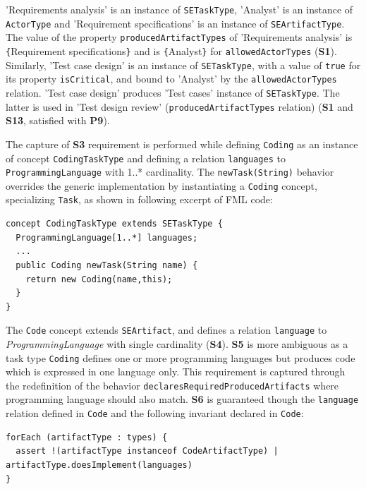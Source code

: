 
\textsf{'Requirements analysis'} is an instance of \texttt{SETaskType}, \textsf{'Analyst'} is an instance of \texttt{ActorType} and \textsf{'Requirement specifications'} is an instance of \texttt{SEArtifactType}. The value of the property \texttt{producedArtifactTypes} of \textsf{'Requirements analysis'} is \texttt{\{}\textsf{Requirement specifications}\texttt{\}} and is \texttt{\{}\textsf{Analyst}\texttt{\}} for \texttt{allowedActorTypes} (\textbf{S1}). Similarly, \textsf{'Test case design'} is an instance of \texttt{SETaskType}, with a value of \texttt{true} for its property \texttt{isCritical}, and bound to \textsf{'Analyst'} by the \texttt{allowedActorTypes} relation. \textsf{'Test case design'} produces \textsf{'Test cases'} instance of \texttt{SETaskType}. The latter is used in \textsf{'Test design review'} (\texttt{producedArtifactTypes} relation) (\textbf{S1} and \textbf{S13}, satisfied with \textbf{P9}). 

The capture of \textbf{S3} requirement is performed while defining \texttt{Coding} as an instance of concept \texttt{CodingTaskType} and defining a relation \texttt{languages} to \texttt{ProgrammingLanguage} with 1..* cardinality. The \texttt{newTask(String)} behavior overrides the generic implementation by instantiating a \texttt{Coding} concept, specializing \texttt{Task}, as shown in following excerpt of FML code:

\begin{lstlisting}
concept CodingTaskType extends SETaskType {
  ProgrammingLanguage[1..*] languages;
  ...
  public Coding newTask(String name) { 
    return new Coding(name,this); 
  }
}    
\end{lstlisting}

The \texttt{Code} concept extends \texttt{SEArtifact}, and defines a relation \texttt{language} to \textit{ProgrammingLanguage} with single cardinality (\textbf{S4}). 
\textbf{S5} is more ambiguous as a task type \texttt{Coding} defines one or more programming languages but produces code which is expressed in one language only. This requirement is captured through the redefinition of the behavior \texttt{declaresRequiredProducedArtifacts} where programming language should also match. 
\textbf{S6} is guaranteed though the \texttt{language} relation defined in \texttt{Code} and the following invariant declared in \texttt{Code}:  
\begin{lstlisting}
forEach (artifactType : types) {
  assert !(artifactType instanceof CodeArtifactType) | artifactType.doesImplement(languages)
}
\end{lstlisting}

